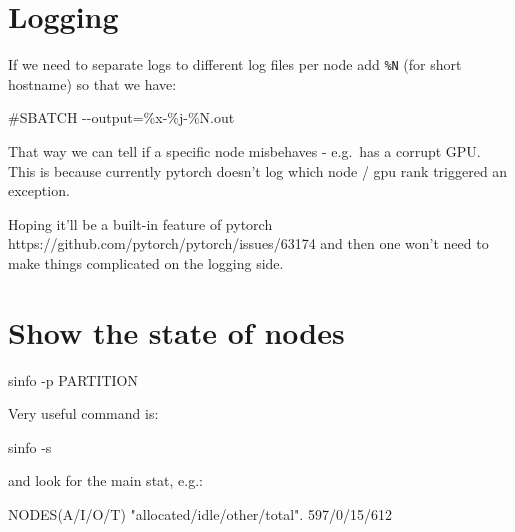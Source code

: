 \documentclass[
]{report}
\newenvironment{Shaded}{\begin{snugshade}}{\end{snugshade}}
\newcommand{\AttributeTok}[1]{\textcolor[rgb]{0.40,0.45,0.13}{#1}}
\newcommand{\CommentTok}[1]{\textcolor[rgb]{0.37,0.37,0.37}{#1}}
\newcommand{\ErrorTok}[1]{\textcolor[rgb]{0.68,0.00,0.00}{#1}}
\newcommand{\ExtensionTok}[1]{\textcolor[rgb]{0.00,0.23,0.31}{#1}}
\newcommand{\KeywordTok}[1]{\textcolor[rgb]{0.00,0.23,0.31}{#1}}
\newcommand{\NormalTok}[1]{\textcolor[rgb]{0.00,0.23,0.31}{#1}}
\newcommand{\StringTok}[1]{\textcolor[rgb]{0.13,0.47,0.30}{#1}}
\begin{document}
\section{Logging}\label{logging}

If we need to separate logs to different log files per node add
\texttt{\%N} (for short hostname) so that we have:

\begin{Shaded}
\begin{Highlighting}[]
\CommentTok{\#SBATCH {-}{-}output=\%x{-}\%j{-}\%N.out}
\end{Highlighting}
\end{Shaded}

That way we can tell if a specific node misbehaves - e.g.~has a corrupt
GPU. This is because currently pytorch doesn't log which node / gpu rank
triggered an exception.

Hoping it'll be a built-in feature of pytorch
https://github.com/pytorch/pytorch/issues/63174 and then one won't need
to make things complicated on the logging side.

\section{Show the state of nodes}\label{show-the-state-of-nodes}

\begin{Shaded}
\begin{Highlighting}[]
\ExtensionTok{sinfo} \AttributeTok{{-}p}\NormalTok{ PARTITION}
\end{Highlighting}
\end{Shaded}

Very useful command is:

\begin{Shaded}
\begin{Highlighting}[]
\ExtensionTok{sinfo} \AttributeTok{{-}s}
\end{Highlighting}
\end{Shaded}

and look for the main stat, e.g.:

\begin{Shaded}
\begin{Highlighting}[]
\ExtensionTok{NODES}\ErrorTok{(}\ExtensionTok{A/I/O/T}\KeywordTok{)} \StringTok{"allocated/idle/other/total"}\ExtensionTok{.}
\ExtensionTok{597/0/15/612}
\end{Highlighting}
\end{Shaded}
\end{document}
